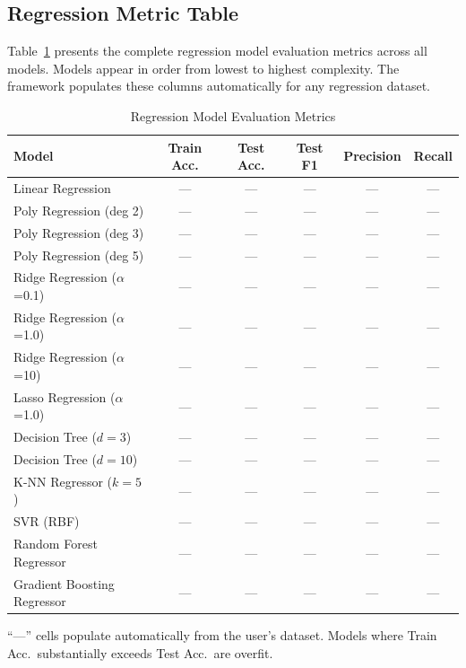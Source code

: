 \documentclass[conference]{IEEEtran}
\begin{document}
\subsection{Regression Metric Table}

Table~\ref{tab:regression} presents the complete regression model evaluation metrics across all models. Models appear in order from lowest to highest complexity. The framework populates these columns automatically for any regression dataset.

\begin{table}[!t]
    \caption{Regression Model Evaluation Metrics}
    \label{tab:regression}
    \centering
    \small
    \renewcommand{\arraystretch}{1.3}
    \begin{tabular}{|>{\raggedright\arraybackslash}p{1.7in}|c|c|c|c|c|}
    \hline
    \textbf{Model} & \textbf{Train Acc.} & \textbf{Test Acc.} & \textbf{Test F1} & \textbf{Precision} & \textbf{Recall} \\
    \hline
    Linear Regression              & --- & --- & --- & --- & --- \\
    \hline
    Poly Regression (deg 2)        & --- & --- & --- & --- & --- \\
    \hline
    Poly Regression (deg 3)        & --- & --- & --- & --- & --- \\
    \hline
    Poly Regression (deg 5)        & --- & --- & --- & --- & --- \\
    \hline
    Ridge Regression ($\alpha$=0.1)& --- & --- & --- & --- & --- \\
    \hline
    Ridge Regression ($\alpha$=1.0)& --- & --- & --- & --- & --- \\
    \hline
    Ridge Regression ($\alpha$=10) & --- & --- & --- & --- & --- \\
    \hline
    Lasso Regression ($\alpha$=1.0)& --- & --- & --- & --- & --- \\
    \hline
    Decision Tree ($d=3$)          & --- & --- & --- & --- & --- \\
    \hline
    Decision Tree ($d=10$)         & --- & --- & --- & --- & --- \\
    \hline
    K-NN Regressor ($k=5$)         & --- & --- & --- & --- & --- \\
    \hline
    SVR (RBF)                      & --- & --- & --- & --- & --- \\
    \hline
    Random Forest Regressor        & --- & --- & --- & --- & --- \\
    \hline
    Gradient Boosting Regressor    & --- & --- & --- & --- & --- \\
    \hline
    \end{tabular}
    \begin{flushleft}
    \small ``---'' cells populate automatically from the user's dataset. Models where Train Acc.\ substantially exceeds Test Acc.\ are overfit.
    \end{flushleft}
\end{table}
\end{document}
